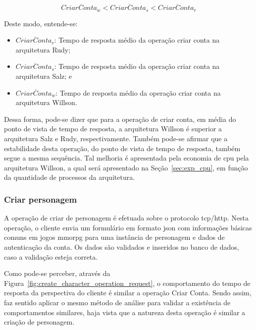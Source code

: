$$
  \overline{CriarConta_{w}} < \overline{CriarConta_{s}} < \overline{CriarConta_{r}}
$$

Deste modo, entende-se:

\begin{itemize}
 \item $\overline{CriarConta_{r}}$: Tempo de resposta médio da operação criar conta na arquitetura Rudy;
 \item $\overline{CriarConta_{s}}$: Tempo de resposta médio da operação criar conta na arquitetura Salz; e
 \item $\overline{CriarConta_{w}}$: Tempo de resposta médio da operação criar conta na arquitetura Willson.
\end{itemize}

Dessa forma, pode-se dizer que para a operação de criar conta, em média do ponto de vista de tempo de resposta, a arquitetura Willson é superior a arquitetura Salz e Rudy, respectivamente.
%
Também pode-se afirmar que a estabilidade desta operação, do ponto de vista de tempo de resposta, também segue a mesma sequência.
%
Tal melhoria é apresentada pela economia de \ac{cpu} pela arquitetura Willson, a qual será apresentado na Seção~\ref{sec:exp_cpu}, em função da quantidade de processos da arquitetura.

\subsubsection{Criar personagem}
\label{sec:op_create_char}

A operação de criar de personagem é efetuada sobre o protocolo \ac{tcp}/\ac{http}.
%
Nesta operação, o cliente envia um formulário em formato \ac{json} com informações básicas comuns em jogos \ac{mmorpg} para uma instância de personagem e dados de autenticação da conta.
%
Os dados são validados e inseridos no banco de dados, caso a validação esteja correta.

Como pode-se perceber, através da Figura~\ref{fig:create_character_operation_request}, o comportamento do tempo de resposta da perspectiva do cliente é similar a operação Criar Conta.
%
Sendo assim, faz sentido aplicar o mesmo método de análise para validar a existência de comportamentos similares, haja vista que a natureza desta operação é similar a criação de personagem.

